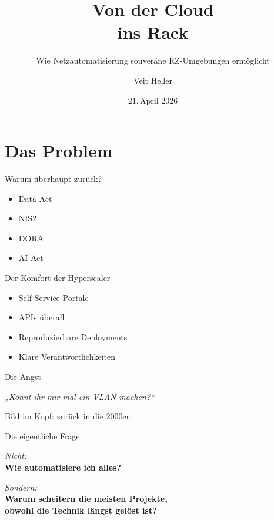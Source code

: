 \documentclass[aspectratio=1610,14pt]{beamer}
\title{Von der Cloud\\ins Rack}
\subtitle{Wie Netzautomatisierung souveräne RZ-Umgebungen ermöglicht}
\date{21.\,April 2026}
\author{Veit Heller}
\institute{Port Zero}
\newcommand{\subhero}[1]{%
  \begin{center}
    {\color{mute}\sffamily #1\par}
  \end{center}
}
\begin{document}
  \begin{frame}
    \titlepage
  \end{frame}

  \section{Das Problem}
  \begin{frame}{Warum überhaupt zurück?}
    \begin{itemize}
      \item Data Act
      \item NIS2
      \item DORA
      \item AI Act
    \end{itemize}
  \end{frame}

  \begin{frame}{Der Komfort der Hyperscaler}
    \begin{itemize}
      \item Self-Service-Portale
      \item APIs überall
      \item Reproduzierbare Deployments
      \item Klare Verantwortlichkeiten
    \end{itemize}
  \end{frame}

  \begin{frame}{Die Angst}
    \vfill
    \begin{center}
      {\sffamily\itshape „Könnt ihr mir mal ein VLAN machen?“\par}
    \end{center}
    \vfill
    \subhero{Bild im Kopf: zurück in die 2000er.}
  \end{frame}

  \begin{frame}{Die eigentliche Frage}
    \vfill
    \begin{center}
      {\color{mute}\itshape Nicht:}\\[0.2em]
      \textbf{Wie automatisiere ich alles?}

      \vspace{1.4em}
      {\color{copper}\itshape Sondern:}\\[0.2em]
      \textbf{Warum scheitern die meisten Projekte,\\
      obwohl die Technik längst gelöst ist?}
    \end{center}
    \vfill
  \end{frame}
\end{document}
